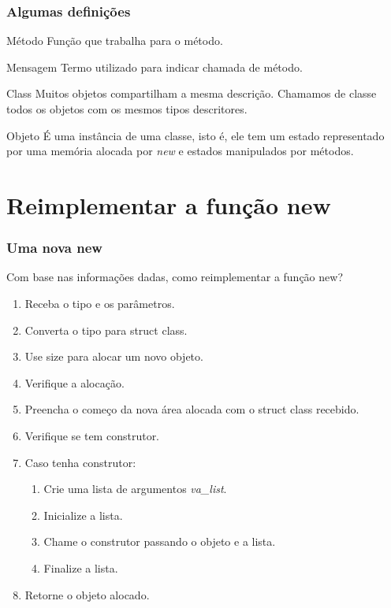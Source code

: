 \documentclass{beamer}
\begin{document}
\begin{frame}
  \frametitle{Algumas definições}

  \pause
  \begin{block}{Método}
   Função que trabalha para o método.
  \end{block}

  \pause
  \begin{block}{Mensagem}
   Termo utilizado para indicar chamada de método.
  \end{block}

  \pause
  \begin{block}{Class}
   Muitos objetos compartilham a mesma descrição. Chamamos de classe todos os 
    objetos com os mesmos tipos descritores.
  \end{block}

  \pause
  \begin{block}{Objeto}
   É uma instância de uma classe, isto é, ele tem um estado representado por 
    uma memória alocada por \textit{new} e estados manipulados por métodos.
  \end{block}

\end{frame}

\section{Reimplementar a função new}

\begin{frame}
  \frametitle{Uma nova new}
  Com base nas informações dadas, como reimplementar a função new?
  \begin{enumerate}
   \item<1-> Receba o tipo e os parâmetros.
   \item<2-> Converta o tipo para struct class.
   \item<3-> Use size para alocar um novo objeto.
   \item<4-> Verifique a alocação.
   \item<5-> Preencha o começo da nova área alocada com o struct class recebido.
   \item<6-> Verifique se tem construtor.
   \item<7-> Caso tenha construtor:
    \begin{enumerate}
     \item<8-> Crie uma lista de argumentos \textit{va\_list}.
     \item<9-> Inicialize a lista.
     \item<10-> Chame o construtor passando o objeto e a lista.
     \item<11-> Finalize a lista.
    \end{enumerate}
  \item<12-> Retorne o objeto alocado.

  \end{enumerate}
\end{frame}
\end{document}
